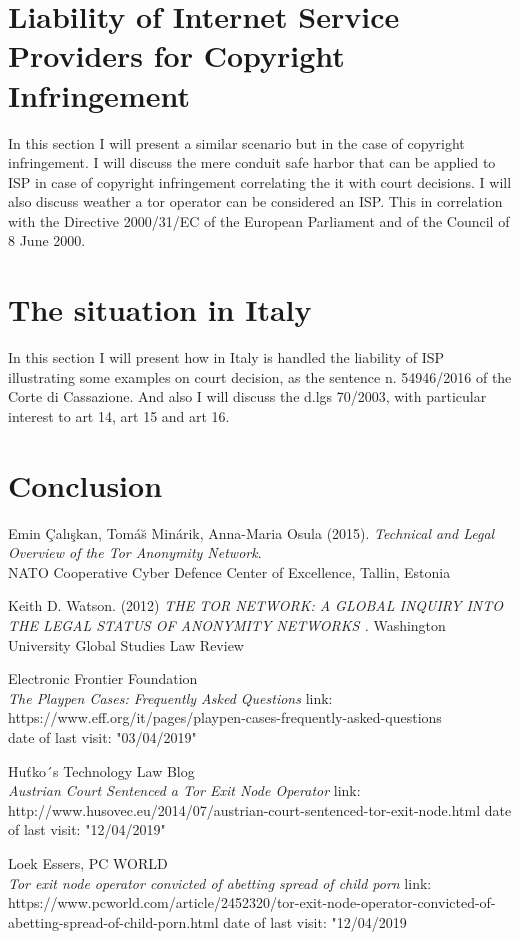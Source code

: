 \documentclass[runningheads,a4paper]{llncs}
\begin{document}
\section{Liability of Internet Service Providers for Copyright Infringement}
In this section I will present a similar scenario but in the case of copyright infringement. I will discuss the mere conduit safe harbor that can be applied to ISP in case of copyright infringement correlating the it with court decisions. I will also discuss weather a tor operator can be considered an ISP. This in correlation with the Directive 2000/31/EC of the European Parliament and of the Council of 8 June 2000.

\section{The situation in Italy}
In this section I will present how in Italy is handled the liability of ISP illustrating some examples on court decision, as the sentence n. 54946/2016 of the Corte di Cassazione. And also I will discuss the d.lgs 70/2003, with particular interest to art 14, art 15 and art 16.

\section{Conclusion}
\blindtext[3]



\begin{thebibliography}{9}

Emin \c{C}alı\c{s}kan, Tom\'{a}\u{s} Min\'{a}rik, Anna-Maria Osula (2015).
\textit{Technical and Legal Overview of the 
Tor Anonymity Network}.\\
NATO Cooperative Cyber Defence Center of 
Excellence, Tallin, Estonia

    Keith D. Watson. (2012)
    \textit{ THE TOR NETWORK: A GLOBAL INQUIRY INTO THE LEGAL STATUS OF ANONYMITY NETWORKS . }
    Washington University Global Studies Law Review

    Electronic Frontier Foundation\\
    \textit{The Playpen Cases: Frequently Asked Questions}
    link: https://www.eff.org/it/pages/playpen-cases-frequently-asked-questions\\
    date of last visit: "03/04/2019"
    
    Huťko´s Technology Law Blog\\
    \textit{Austrian Court Sentenced a Tor Exit Node Operator}
    link:     http://www.husovec.eu/2014/07/austrian-court-sentenced-tor-exit-node.html
    date of last visit: "12/04/2019"
    
    Loek Essers, PC WORLD\\
    \textit{Tor exit node operator convicted of abetting spread of child porn}
    link:         https://www.pcworld.com/article/2452320/tor-exit-node-operator-convicted-of-abetting-spread-of-child-porn.html
    date of last visit: "12/04/2019

\end{thebibliography}
\end{document}

